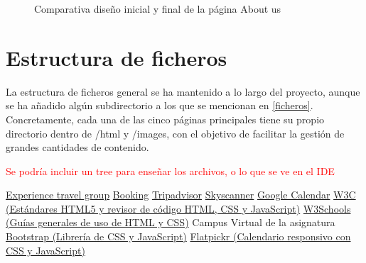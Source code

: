 \documentclass[11pt, a4paper]{book}
\begin{document}
\begin{figure} [H]
\begin{minipage}[c]{0.45\textwidth}
		\end{minipage}
		\caption{Comparativa diseño inicial y final de la página About us}
	\end{figure}
	
	
	\section{Estructura de ficheros}
	La estructura de ficheros general se ha mantenido a lo largo del proyecto, aunque se ha añadido algún subdirectorio a los que se mencionan en \ref{ficheros}. Concretamente, cada una de las cinco páginas principales tiene su propio directorio dentro de /html y /images, con el objetivo de facilitar la gestión de grandes cantidades de contenido.
	
	\begin{huge}
		\textcolor{red}{Se podría incluir un tree para enseñar los archivos, o lo que se ve en el IDE}
	\end{huge}
	
	

	\begin{thebibliography}{9}
		 \href{https://experiencetravelgroup.com}{Experience travel group}
		 \href{https://booking.com}{Booking}
		 \href{https://tripadvisor.es}{Tripadvisor}
		 \href{https://skyscanner.es}{Skyscanner}
		 \href{https://calendar.google.com/calendar/u/0/r}{Google Calendar}
		 \href{https://html.spec.whatwg.org/multipage/}{W3C (Estándares HTML5 y revisor de código HTML, CSS y JavaScript)}
		 \href{https://www.w3schools.com/}{W3Schools (Guías generales de uso de HTML y CSS)} 
		 Campus Virtual de la asignatura
		 \href{https://getbootstrap.com/}{Bootstrap (Librería de CSS y JavaScript)}
		 \href{https://flatpickr.js.org/}{Flatpickr (Calendario responsivo con CSS y JavaScript)}
	\end{thebibliography}
	
	
	
\end{document}
